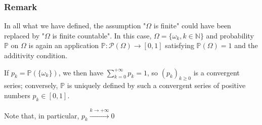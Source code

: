             \subsubsection{Remark}
                In all what we have defined, the assumption "$\Omega$ is finite" could have been replaced by "$\Omega$ is finite countable". In this case, $\Omega = \{\omega_k, k\in \mathbb{N}\}$ and probability $\mathbb{P}$ on $\Omega$ is again an application $\mathbb{P}: \mathcal{P}(\Omega)\rightarrow [0,1]$ satisfying $\mathbb{P}(\Omega)=1$ and the additivity condition.

                If $p_k=\mathbb{P}(\{\omega_k\})$, we then have $\sum_{k=0}^{+\infty}p_k=1$, so $(p_k)_{k\geq 0}$ is a convergent series; conversely, $\mathbb{P}$ is uniquely defined by such a convergent series of positive numbers $p_k\in [0,1]$.

                Note that, in particular, $p_k\xrightarrow[]{k\rightarrow +\infty}0$
